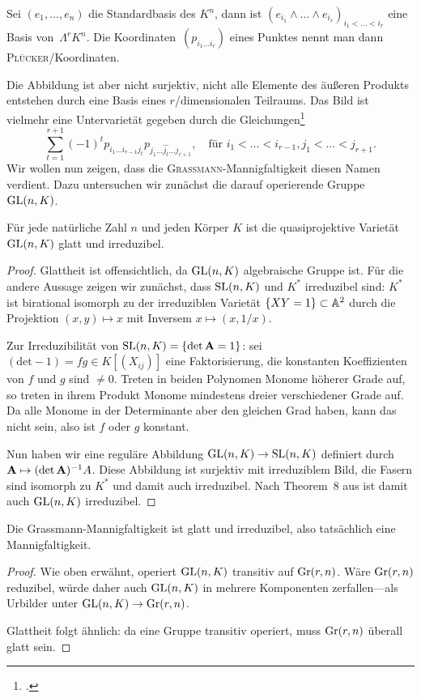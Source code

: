 Sei $(e_1, \dots, e_n)$ die Standardbasis des $K^n$, dann ist $(e_{i_1} \wedge \dots \wedge e_{i_r})_{i_1 < \dots < i_r}$ eine Basis von~$\Lambda^r K^n$. Die Koordinaten~$(p_{i_1 \dots i_r})$ eines Punktes nennt man dann \textsc{Plücker}\-/Koordinaten.

Die Abbildung ist aber nicht surjektiv, nicht alle Elemente des äußeren Produkts entstehen durch eine Basis eines $r$\-/dimensionalen Teilraums. Das Bild ist vielmehr eine Untervarietät gegeben durch die Gleichungen\footcite[siehe][S.~42]{Shafarevich}
\begin{equation} \label{eq:grcond}
\sum_{t=1}^{r+1} (-1)^t p_{i_1 \dots i_{r-1} j_t} p_{j_1 \dots \hat{j_t} \dots j_{r+1}}, \quad\text{für } i_1 < \dots < i_{r-1}, j_1 < \dots < j_{r+1}.
\end{equation}
Wir wollen nun zeigen, dass die \textsc{Grassmann}-Mannigfaltigkeit diesen Namen verdient. Dazu untersuchen wir zunächst die darauf operierende Gruppe~$\mathrm{GL}(n,K)$.

\begin{lemma}
Für jede natürliche Zahl $n$ und jeden Körper $K$ ist die quasiprojektive Varietät~$\mathrm{GL}(n,K)$ glatt und irreduzibel.
\end{lemma}
\begin{proof}
Glattheit ist offensichtlich, da $\mathrm{GL}(n,K)$ algebraische Gruppe ist. Für die andere Aussage zeigen wir zunächst, dass $\mathrm{SL}(n,K)$ und $K^*$ irreduzibel sind: $K^*$ ist birational isomorph zu der irreduziblen Varietät $\{ XY = 1 \} \subset \mathbb A^{2}$ durch die Projektion $(x,y) \mapsto x$ mit Inversem $x \mapsto (x,1/x)$.

Zur Irreduzibilität von $\mathrm{SL}(n,K) = \{\det \mathbf{A} = 1\}$: sei $(\mathrm{det}-1)=fg \in K[(X_{ij})]$ eine Faktorisierung, die konstanten Koeffizienten von $f$ und $g$ sind $\neq 0$. Treten in beiden Polynomen Monome höherer Grade auf, so treten in ihrem Produkt Monome mindestens dreier verschiedener Grade auf. Da alle Monome in der Determinante aber den gleichen Grad haben, kann das nicht sein, also ist $f$ oder $g$ konstant.

Nun haben wir eine reguläre Abbildung $\mathrm{GL}(n,K) \rightarrow \mathrm{SL}(n,K)$ definiert durch $\mathbf{A} \mapsto \mathbf{(}\!\det \mathbf{A})^{-1} A$. Diese Abbildung ist surjektiv mit irreduziblem Bild, die Fasern sind isomorph zu $K^*$ und damit auch irreduzibel. Nach Theorem~8 aus \cite[S.~77]{Shafarevich} ist damit auch $\mathrm{GL}(n,K)$ irreduzibel.
\end{proof}

\begin{fact} \label{fact:grassirred}
Die Grassmann-Mannigfaltigkeit ist glatt und irreduzibel, also tatsächlich eine Mannigfaltigkeit.
\end{fact}
\begin{proof}
Wie oben erwähnt, operiert $\mathrm{GL}(n,K)$ transitiv auf $\grass r/n$. Wäre $\grass r/n$ reduzibel, würde daher auch $\mathrm{GL}(n,K)$ in mehrere Komponenten zerfallen---als Urbilder unter $\GL nK \to \grass r/n$.

Glattheit folgt ähnlich: da eine Gruppe transitiv operiert, muss $\grass r/n$ überall glatt sein.
\end{proof}

